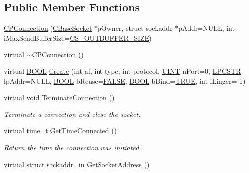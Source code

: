 \subsection*{\-Public \-Member \-Functions}
\begin{DoxyCompactItemize}
\item 
\hyperlink{class_c_p_connection_a512354ba23583d1bddc9cb4999d248f3}{\-C\-P\-Connection} (\hyperlink{class_c_base_socket}{\-C\-Base\-Socket} $\ast$p\-Owner, struct sockaddr $\ast$p\-Addr=\-N\-U\-L\-L, int i\-Max\-Send\-Buffer\-Size=\hyperlink{class_c_p_connection_a806d0ccf9284ab6cfa8f9f638df5b8e5ae1bfa53acfedd84586f9577402592e70}{\-C\-S\-\_\-\-O\-U\-T\-B\-U\-F\-F\-E\-R\-\_\-\-S\-I\-Z\-E})
\item 
virtual \hyperlink{class_c_p_connection_a7a06ca261e3c9418bf9cfe63bba8ad44}{$\sim$\-C\-P\-Connection} ()
\item 
virtual \hyperlink{_cpclient_8h_a3be13892ae7076009afcf121347dd319}{\-B\-O\-O\-L} \hyperlink{class_c_p_connection_a666a669dc7dfde6478fb599104cace44}{\-Create} (int af, int type, int protocol, \hyperlink{_x_plat_8h_a45c20c14d3d8790a22153d08ab2eb2ff}{\-U\-I\-N\-T} n\-Port=0, \hyperlink{_x_plat_8h_a2b72c6037793f6c6381a09c83f27569b}{\-L\-P\-C\-S\-T\-R} lp\-Addr=\-N\-U\-L\-L, \hyperlink{_cpclient_8h_a3be13892ae7076009afcf121347dd319}{\-B\-O\-O\-L} b\-Reuse=\hyperlink{_x_plat_8h_aa93f0eb578d23995850d61f7d61c55c1}{\-F\-A\-L\-S\-E}, \hyperlink{_cpclient_8h_a3be13892ae7076009afcf121347dd319}{\-B\-O\-O\-L} b\-Bind=\hyperlink{_x_plat_8h_aa8cecfc5c5c054d2875c03e77b7be15d}{\-T\-R\-U\-E}, int i\-Linger=-\/1)
\item 
virtual \hyperlink{_cpclient_8h_a6464f7480a0fd0ee170cba12b2c0497f}{void} \hyperlink{class_c_p_connection_a62d7805ad5ad95853f68628d5df4f0f1}{\-Terminate\-Connection} ()
\begin{DoxyCompactList}\small\item\em \-Terminate a connection and close the socket. \end{DoxyCompactList}\item 
virtual time\-\_\-t \hyperlink{class_c_p_connection_acbc1f976fdecf17d5d3b0b75b524d69c}{\-Get\-Time\-Connected} ()
\begin{DoxyCompactList}\small\item\em \-Return the time the connection was initiated. \end{DoxyCompactList}\item 
virtual struct sockaddr\-\_\-in \hyperlink{class_c_p_connection_a8a68ba35336e1255ae4c1e3bb77fb0e5}{\-Get\-Socket\-Address} ()

\end{DoxyCompactItemize}
